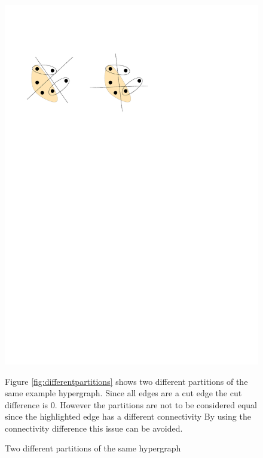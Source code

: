 \documentclass[a4paper,12pt,titlepage, BCOR7mm,headsepline]{scrbook}
\numberwithin{equation}{section}
\begin{document}
\begin{figure}[H] 

    \vspace*{-.25cm}
  \begin{center}
   \includegraphics[width=.8\textwidth]{Ipe/connexample.pdf}
  \caption{Two different partitions of the same hypergraph}\label{fig:differentpartitions} 
  \label{fig:diversity}
  \end{center}
  Figure \ref{fig:differentpartitions} shows two different partitions of the same example hypergraph. Since all edges are a cut edge the cut difference is 0. However the partitions are not to be considered equal since the highlighted edge has 
  a different connectivity By using the connectivity difference this issue can be avoided. 
\end{figure}
\end{document}
